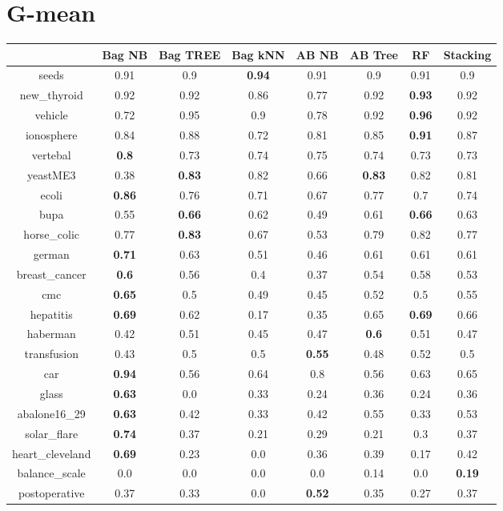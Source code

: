 \documentclass{article}%
\begin{document}
\section*{G{-}mean}%
\begin{tabular}{c|ccccccc}%
&Bag NB&Bag TREE&Bag kNN&AB NB&AB Tree&RF&Stacking\\%
\hline%
seeds&0.91&0.9&\textbf{0.94}&0.91&0.9&0.91&0.9\\%
new\_thyroid&0.92&0.92&0.86&0.77&0.92&\textbf{0.93}&0.92\\%
vehicle&0.72&0.95&0.9&0.78&0.92&\textbf{0.96}&0.92\\%
ionosphere&0.84&0.88&0.72&0.81&0.85&\textbf{0.91}&0.87\\%
vertebal&\textbf{0.8}&0.73&0.74&0.75&0.74&0.73&0.73\\%
yeastME3&0.38&\textbf{0.83}&0.82&0.66&\textbf{0.83}&0.82&0.81\\%
ecoli&\textbf{0.86}&0.76&0.71&0.67&0.77&0.7&0.74\\%
bupa&0.55&\textbf{0.66}&0.62&0.49&0.61&\textbf{0.66}&0.63\\%
horse\_colic&0.77&\textbf{0.83}&0.67&0.53&0.79&0.82&0.77\\%
german&\textbf{0.71}&0.63&0.51&0.46&0.61&0.61&0.61\\%
breast\_cancer&\textbf{0.6}&0.56&0.4&0.37&0.54&0.58&0.53\\%
cmc&\textbf{0.65}&0.5&0.49&0.45&0.52&0.5&0.55\\%
hepatitis&\textbf{0.69}&0.62&0.17&0.35&0.65&\textbf{0.69}&0.66\\%
haberman&0.42&0.51&0.45&0.47&\textbf{0.6}&0.51&0.47\\%
transfusion&0.43&0.5&0.5&\textbf{0.55}&0.48&0.52&0.5\\%
car&\textbf{0.94}&0.56&0.64&0.8&0.56&0.63&0.65\\%
glass&\textbf{0.63}&0.0&0.33&0.24&0.36&0.24&0.36\\%
abalone16\_29&\textbf{0.63}&0.42&0.33&0.42&0.55&0.33&0.53\\%
solar\_flare&\textbf{0.74}&0.37&0.21&0.29&0.21&0.3&0.37\\%
heart\_cleveland&\textbf{0.69}&0.23&0.0&0.36&0.39&0.17&0.42\\%
balance\_scale&0.0&0.0&0.0&0.0&0.14&0.0&\textbf{0.19}\\%
postoperative&0.37&0.33&0.0&\textbf{0.52}&0.35&0.27&0.37\\%
\end{tabular}

%
\end{document}
